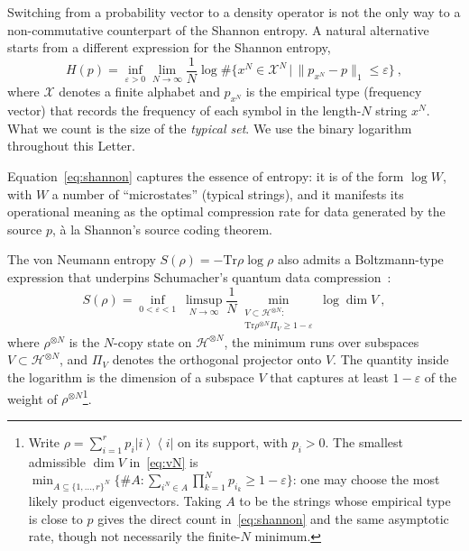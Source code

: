 \documentclass[aps,prl,twocolumn,superscriptaddress,amsmath,amssymb,reprint,longbibliography]{revtex4-2}
\newcommand{\ketbra}[2]{\left|#1\right\rangle\!\!\left\langle #2\right|}
\def\eps{\varepsilon}
\newcommand*{\Tr}{\mathrm{Tr}}
\begin{document}
Switching from a probability vector to a density operator is not the only way to a non-commutative counterpart of the Shannon entropy. A natural alternative starts from a different expression for the Shannon entropy,
\begin{equation}\label{eq:shannon}
    H({p})=\inf_{\eps>0}\lim_{N\to\infty}\frac1N\log \#\{ x^N\in \mathcal{X}^N \, \big\vert\, \| p_{x^N}-{p}\|_1\le\eps \}\ ,
\end{equation}
where $\mathcal{X}$ denotes a finite alphabet and $ p_{x^N}$ is the empirical type (frequency vector) that records the frequency of each symbol in the length-$N$ string $x^N$. What we count is the size of the \emph{typical set}. We use the binary logarithm throughout this Letter.

Equation~\eqref{eq:shannon} captures the essence of entropy: it is of the form $\log W$, with $W$ a number of ``microstates'' (typical strings), and it manifests its operational meaning as the optimal compression rate for data generated by the source $p$, \`a la Shannon's source coding theorem.

The von Neumann entropy $S(\rho) = -\Tr \rho\log \rho$ also admits a Boltzmann-type expression that underpins Schumacher's quantum data compression~\cite{schumacher1995quantum}:
\begin{equation}\label{eq:vN}
S(\rho)
=\inf_{0<\eps<1}\ \limsup_{N\to\infty} \frac1N
\min_{\substack{V\subset\mathcal H^{\otimes N}:\\
\Tr\rho^{\otimes N}\Pi_V\ge 1-\eps}}\log\dim V\ ,
\end{equation}
where $\rho^{\otimes N}$ is the $N$-copy state on $\mathcal H^{\otimes N}$, the minimum runs over subspaces $V\subset \mathcal H^{\otimes N}$, and $\Pi_V$ denotes the
orthogonal projector onto $V$.
The quantity inside the logarithm is the dimension of a subspace $V$ that captures
at least $1-\eps$ of the weight of $\rho^{\otimes N}$\footnote{Write $\rho=\sum_{i=1}^r p_i\ketbra{i}{i}$ on its support, with $p_i>0$. The smallest admissible $\dim V$ in~\eqref{eq:vN} is $\min_{A\subseteq\{1,\dots,r\}^N}\{\#A:\sum_{i^N\in A}\prod_{k=1}^N p_{i_k}\ge1-\eps\}$: one may choose the most likely product eigenvectors. Taking $A$ to be the strings whose empirical type is close to $p$ gives the direct count in~\eqref{eq:shannon} and the same asymptotic rate, though not necessarily the finite-$N$ minimum.}.
\end{document}
